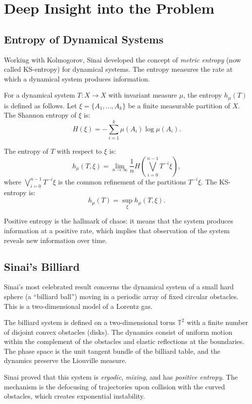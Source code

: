\section{Deep Insight into the Problem}

\subsection{Entropy of Dynamical Systems}

Working with Kolmogorov, Sinai developed the concept of \emph{metric entropy} (now called KS-entropy) for dynamical systems. The entropy measures the rate at which a dynamical system produces information.

For a dynamical system $T: X \to X$ with invariant measure $\mu$, the entropy $h_\mu(T)$ is defined as follows. Let $\xi = \{A_1,\ldots,A_k\}$ be a finite measurable partition of $X$. The Shannon entropy of $\xi$ is:
\[
H(\xi) = -\sum_{i=1}^k \mu(A_i) \log \mu(A_i).
\]

The entropy of $T$ with respect to $\xi$ is:
\[
h_\mu(T,\xi) = \lim_{n\to\infty} \frac{1}{n} H\left(\bigvee_{i=0}^{n-1} T^{-i}\xi\right),
\]
where $\bigvee_{i=0}^{n-1} T^{-i}\xi$ is the common refinement of the partitions $T^{-i}\xi$. The KS-entropy is:
\[
h_\mu(T) = \sup_{\xi} h_\mu(T,\xi).
\]

Positive entropy is the hallmark of chaos: it means that the system produces information at a positive rate, which implies that observation of the system reveals new information over time.

\subsection{Sinai's Billiard}

Sinai's most celebrated result concerns the dynamical system of a small hard sphere (a ``billiard ball'') moving in a periodic array of fixed circular obstacles. This is a two-dimensional model of a Lorentz gas.

The billiard system is defined on a two-dimensional torus $\mathbb{T}^2$ with a finite number of disjoint convex obstacles (disks). The dynamics consist of uniform motion within the complement of the obstacles and elastic reflections at the boundaries. The phase space is the unit tangent bundle of the billiard table, and the dynamics preserve the Liouville measure.

Sinai proved that this system is \emph{ergodic}, \emph{mixing}, and has \emph{positive entropy}. The mechanism is the defocusing of trajectories upon collision with the curved obstacles, which creates exponential instability.

